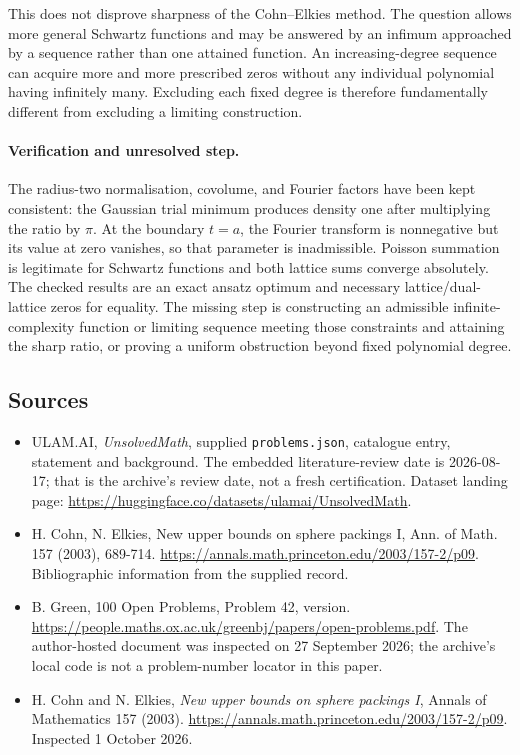 \documentclass[11pt,a4paper]{article}
\begin{document}
This does not disprove sharpness of the Cohn--Elkies method. The question allows more general Schwartz functions and may be answered by an infimum approached by a sequence rather than one attained function. An increasing-degree sequence can acquire more and more prescribed zeros without any individual polynomial having infinitely many. Excluding each fixed degree is therefore fundamentally different from excluding a limiting construction.

\paragraph{Verification and unresolved step.}
The radius-two normalisation, covolume, and Fourier factors have been kept consistent: the Gaussian trial minimum produces density one after multiplying the ratio by $\pi$. At the boundary $t=a$, the Fourier transform is nonnegative but its value at zero vanishes, so that parameter is inadmissible. Poisson summation is legitimate for Schwartz functions and both lattice sums converge absolutely. The checked results are an exact ansatz optimum and necessary lattice/dual-lattice zeros for equality. The missing step is constructing an admissible infinite-complexity function or limiting sequence meeting those constraints and attaining the sharp ratio, or proving a uniform obstruction beyond fixed polynomial degree.

\subsection{Sources}

{\small

\begin{itemize}

\item[\hypertarget{source:statement:1}{S1}] ULAM.AI, \emph{UnsolvedMath}, supplied \texttt{problems.json}, catalogue entry, statement and background. The embedded literature-review date is 2026-08-17; that is the archive’s review date, not a fresh certification. Dataset landing page: \url{https://huggingface.co/datasets/ulamai/UnsolvedMath}.

\item[\hypertarget{source:statement:2}{S2}] H. Cohn, N. Elkies, New upper bounds on sphere packings I, Ann. of Math. 157 (2003), 689-714. \url{https://annals.math.princeton.edu/2003/157-2/p09}. Bibliographic information from the supplied record.

\item[\hypertarget{source:statement:3}{S3}] B. Green, 100 Open Problems, Problem 42, version. \url{https://people.maths.ox.ac.uk/greenbj/papers/open-problems.pdf}. The author-hosted document was inspected on 27 September 2026; the archive’s local code is not a problem-number locator in this paper.

\item[E1] H. Cohn and N. Elkies, \emph{New upper bounds on sphere packings I}, Annals of Mathematics 157 (2003). \url{https://annals.math.princeton.edu/2003/157-2/p09}. Inspected 1 October 2026.

\end{itemize}

}

\label{end:statement}
\end{document}
